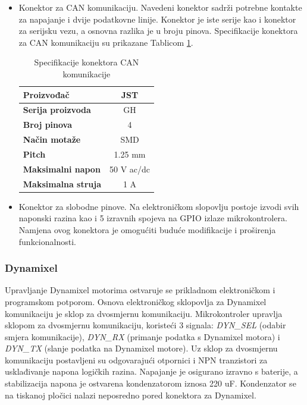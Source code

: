\documentclass[11pt,a4paper]{article}
\begin{document}
\begin{center}
\begin{itemize}
		
		\item Konektor za CAN komunikaciju. Navedeni konektor sadrži potrebne kontakte za napajanje i dvije podatkovne linije. Konektor je iste serije kao i konektor za serijsku vezu, a osnovna razlika je u broju pinova. Specifikacije konektora za CAN komunikaciju su prikazane Tablicom \ref{tab:specifikacija_connector_CAN}.
		
\begin{table}[H]
	\centering
	\caption{Specifikacije konektora CAN komunikacije}
	\label{tab:specifikacija_connector_CAN}
	\begin{tabular}{|l|c|}
		\hline
		\textbf{Proizvođač} & JST \\ \hline 
		\textbf{Serija proizvoda} & GH \\ \hline 
		\textbf{Broj pinova} & 4 \\ \hline 
		\textbf{Način motaže} & SMD    \\ \hline
		\textbf{Pitch} & 1.25 mm    \\ \hline 
		\textbf{Maksimalni napon} & 50 V  ac/dc\\ \hline 
		\textbf{Maksimalna struja} & 1 A \\ \hline
	\end{tabular}
\end{table}
		
		
		\item Konektor za slobodne pinove. Na elektroničkom slopovlju postoje izvodi svih naponski razina kao i 5 izravnih spojeva na GPIO izlaze mikrokontrolera. Namjena ovog konektora je omogućiti buduće modifikacije i proširenja funkcionalnosti.	
		
	\end{itemize}
\end{center}



\subsubsection{Dynamixel}
 Upravljanje Dynamixel motorima ostvaruje se prikladnom elektroničkom i programskom potporom. Osnova elektroničkog sklopovlja za Dynamixel komunikaciju je sklop za dvosmjernu komunikaciju. Mikrokontroler upravlja sklopom za dvosmjernu komunikaciju, koristeći 3 signala: \textit{DYN\_SEL} (odabir smjera komunikacije), \textit{DYN\_RX} (primanje podatka s Dynamixel motora) i \textit{DYN\_TX} (slanje podatka na Dynamixel motore). Uz sklop za dvosmjernu komunikaciju postavljeni su odgovarajući otpornici i NPN tranzistori za usklađivanje napona logičkih razina. Napajanje je osigurano izravno s baterije, a stabilizacija napona je ostvarena kondenzatorom iznosa 220 uF. Kondenzator se na tiskanoj pločici nalazi neposredno pored konektora za Dynamixel.
\end{document}
